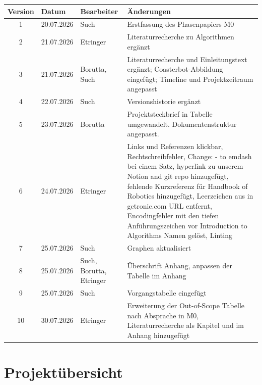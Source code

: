 \documentclass[
  a4paper,
  12pt,
  DIV=12,        %
  parskip=half,  %
  headings=small %
]{scrartcl}
\theoremstyle{definition}
\theoremstyle{definition}
\begin{document}
\begin{tabularx}{\textwidth}{@{}clp{2.6cm}X@{}}
\toprule
\textbf{Version} & \textbf{Datum} & \textbf{Bearbeiter} & \textbf{Änderungen}\\
\midrule
1 & 20.07.2026 & Such & Erstfassung des Phasenpapiers M0\\
2 & 21.07.2026 & Etringer & Literaturrecherche zu Algorithmen ergänzt\\
3 & 21.07.2026 & Borutta, Such & Literaturrecherche und Einleitungstext ergänzt; Coasterbot-Abbildung eingefügt; Timeline und Projektzeitraum angepasst\\
4 & 22.07.2026 & Such & Versionshistorie ergänzt\\
5 & 23.07.2026 & Borutta & Projektsteckbrief in Tabelle umgewandelt. Dokumentenstruktur angepasst.\\
6 & 24.07.2026 & Etringer & Links und Referenzen klickbar,
  Rechtschreibfehler, Change: - to emdash bei einem Satz, hyperlink zu unserem
  Notion and git repo hinzugefügt, fehlende Kurzreferenz für Handbook of
  Robotics hinzugefügt, Leerzeichen aus in gctronic.com URL entfernt,
  Encodingfehler mit den tiefen Anführungszeichen vor Introduction to
  Algorithms Namen gelöst, Linting \\
7 & 25.07.2026 & Such & Graphen aktualisiert \\
8 & 25.07.2026 & Such, Borutta, Etringer & Überschrift Anhang, anpassen der Tabelle im Anhang\\
9 & 25.07.2026 & Such & Vorgangstabelle eingefügt\\
10 & 30.07.2026 & Etringer & Erweiterung der Out-of-Scope Tabelle nach Absprache in M0, Literaturrecherche als Kapitel und im Anhang hinzugefügt\\
\bottomrule
\end{tabularx}


\newpage

\tableofcontents

\newpage


\section{Projektübersicht}
\end{document}
